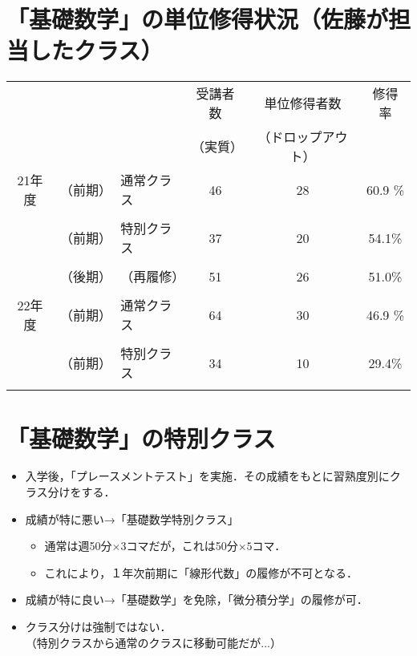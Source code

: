 \documentclass[a4j,landscape,25pt]{jsarticle}
\begin{document}
\section{「基礎数学」の単位修得状況（佐藤が担当したクラス）}

\begin{center}
\begin{tabular}{|c|rl|c|c|c|}
\hline
&&&{\small 受講者数}&{\small 単位修得者数}&{\small 修得率}\vspace{-8pt}\\
&&&{\scriptsize （実質）}&{\scriptsize （ドロップアウト）}&\\
\hline
\hline
21年度&（前期）&通常クラス&46&28&60.9 \%\\
&&&{\color{blue}{40}}&{\color{blue}{6 (13.0\%)}}&{\color{blue}{70.0\%}}\\
\hline
&（前期）&特別クラス&37&20&54.1\%\\
&&&{\color{blue}{32}}&{\color{blue}{32 (13.5\%)}}&{\color{blue}{62.5\%}}\\
\hline
&（後期）&（再履修）&51&26&51.0\%\\
&&&{\color{blue}{40}}&{\color{blue}{11 (21.6\%)}}&{\color{blue}{65.0\%}}\\
\hline
\hline
22年度&（前期）&通常クラス&64&30&46.9 \%\\
&&&{\color{blue}{59}}&{\color{blue}{5 (7.8\%)}}&{\color{blue}{50.8\%}}\\
\hline
&（前期）&特別クラス&34&10&29.4\%\\
&&&{\color{blue}{26}}&{\color{blue}{8 (23.5\%)}}&{\color{blue}{38.5\%}}\\
\hline
 \end{tabular}
\end{center}

\section{「基礎数学」の特別クラス}

\begin{itemize}
\item 入学後，「プレースメントテスト」を実施．その成績をもとに習熟度別にクラス分けをする．\\
\item 成績が特に悪い→「基礎数学特別クラス」
\begin{itemize}
\item 通常は週50分$\times 3$コマだが，これは50分$\times 5$コマ．
\item これにより，１年次前期に「線形代数」の履修が不可となる．\\
\end{itemize}
\item  成績が特に良い→「基礎数学」を免除，「微分積分学」の履修が可．\\
\item クラス分けは強制ではない．\\
（特別クラスから通常のクラスに移動可能だが...）
\end{itemize}
\end{document}

